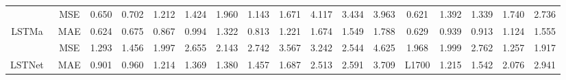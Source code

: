 \documentclass{article}
\begin{document}
\begin{table*}[htbp]
\begin{threeparttable}
{\begin{tabular}{c|c|c|c|c|c|c|c|c|c|c|c|c|c|c|c|c}
                                   & MSE                                & 0.650                        & 0.702                        & 1.212                        & 1.424                        & 1.960                        & 1.143                        & 1.671                        & 4.117                        & 3.434                        & 3.963                        & 0.621                        & 1.392                        & 1.339                        & 1.740                        & 2.736                        \\ \multirow{-2}{*}{LSTMa~\cite{bahdanau2015neural}}            & MAE                                & 0.624                        & 0.675                        & 0.867                        & 0.994                        & 1.322                        & 0.813                        & 1.221                        & 1.674                        & 1.549                        & 1.788                        & 0.629                        & 0.939                        & 0.913                        & 1.124                        & 1.555                        \\ \hline
                                   & MSE                                & 1.293                        & 1.456                        & 1.997                        & 2.655                        & 2.143                        & 2.742                        & 3.567                        & 3.242                        & 2.544                        & 4.625                        & 1.968                        & 1.999                        & 2.762                        & 1.257                        & 1.917                        \\ \multirow{-2}{*}{LSTNet~\cite{Lai2018ModelingLA}}           & MAE                                & 0.901                        & 0.960                        & 1.214                        & 1.369                        & 1.380                        & 1.457                        & 1.687                        & 2.513                        & 2.591                        & 3.709                        & L1700                        & 1.215                        & 1.542                        & 2.076                        & 2.941                        \\ \hline

\end{tabular}}
\end{threeparttable}
\end{table*}
\end{document}

